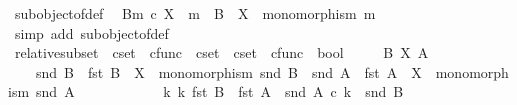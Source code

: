 \begin{isabellebody}
\isanewline
{}\isamarkupfalse%
\ subobject{\isacharunderscore}{\kern0pt}of{\isacharunderscore}{\kern0pt}def{}{\isacharcolon}{\kern0pt}\isanewline
\ \ {\isachardoublequoteopen}{\isacharparenleft}{\kern0pt}B{\isacharcomma}{\kern0pt}m{\isacharparenright}{\kern0pt}\ {\isasymsubseteq}\isactrlsub c\ X\ {\isacharequal}{\kern0pt}\ {\isacharparenleft}{\kern0pt}m\ {\isacharcolon}{\kern0pt}\ B\ {\isasymrightarrow}\ X\ {\isasymand}\ monomorphism\ m{\isacharparenright}{\kern0pt}{\isachardoublequoteclose}\isanewline
%
\isadelimproof
\ \ %
\endisadelimproof
%
\isatagproof
{}\isamarkupfalse%
\ {\isacharparenleft}{\kern0pt}simp\ add{\isacharcolon}{\kern0pt}\ subobject{\isacharunderscore}{\kern0pt}of{\isacharunderscore}{\kern0pt}def{\isacharparenright}{\kern0pt}%
\endisatagproof
{\isafoldproof}%
%
\isadelimproof
\isanewline
%
\endisadelimproof
\isanewline
{}\isamarkupfalse%
\ relative{\isacharunderscore}{\kern0pt}subset\ {\isacharcolon}{\kern0pt}{\isacharcolon}{\kern0pt}\ {\isachardoublequoteopen}cset\ {\isasymtimes}\ cfunc\ {\isasymRightarrow}\ cset\ {\isasymRightarrow}\ cset\ {\isasymtimes}\ cfunc\ {\isasymRightarrow}\ bool{\isachardoublequoteclose}\ {\isacharparenleft}{\kern0pt}{\isachardoublequoteopen}{\isacharunderscore}{\kern0pt}{\isasymsubseteq}\isactrlbsub {\isacharunderscore}{\kern0pt}\isactrlesub {\isacharunderscore}{\kern0pt}{\isachardoublequoteclose}\ {\isacharbrackleft}{\kern0pt}{}{}{\isacharcomma}{\kern0pt}{}{}{\isacharcomma}{\kern0pt}{}{}{\isacharbrackright}{\kern0pt}{}{}{\isacharparenright}{\kern0pt}\isanewline
\ \ \ {\isachardoublequoteopen}B\ {\isasymsubseteq}\isactrlbsub X\isactrlesub \ A\ \ {\isasymlongleftrightarrow}\ \isanewline
\ \ \ \ {\isacharparenleft}{\kern0pt}snd\ B\ {\isacharcolon}{\kern0pt}\ fst\ B\ {\isasymrightarrow}\ X\ {\isasymand}\ monomorphism\ {\isacharparenleft}{\kern0pt}snd\ B{\isacharparenright}{\kern0pt}\ {\isasymand}\ snd\ A\ {\isacharcolon}{\kern0pt}\ fst\ A\ {\isasymrightarrow}\ X\ {\isasymand}\ monomorphism\ {\isacharparenleft}{\kern0pt}snd\ A{\isacharparenright}{\kern0pt}\isanewline
\ \ \ \ \ \ \ \ \ \ {\isasymand}\ {\isacharparenleft}{\kern0pt}{\isasymexists}\ k{\isachardot}{\kern0pt}\ k{\isacharcolon}{\kern0pt}\ fst\ B\ {\isasymrightarrow}\ fst\ A\ {\isasymand}\ snd\ A\ {\isasymcirc}\isactrlsub c\ k\ {\isacharequal}{\kern0pt}\ snd\ B{\isacharparenright}{\kern0pt}{\isacharparenright}{\kern0pt}{\isachardoublequoteclose}\isanewline
\isanewline
{}\isamarkupfalse%

\end{isabellebody}
